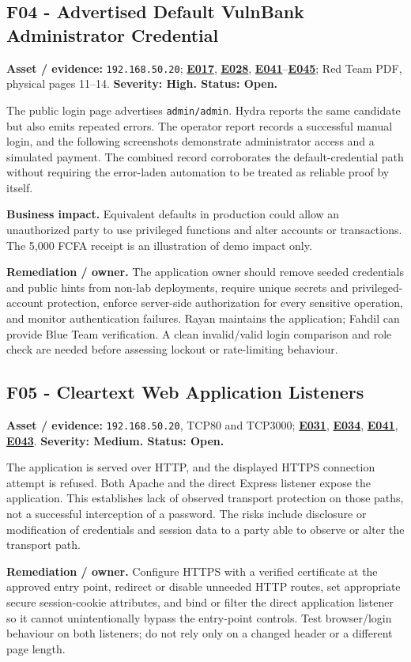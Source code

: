 \documentclass[11pt,a4paper]{article}
\newcommand{\ev}[1]{\hyperref[ev:#1]{\textbf{#1}}}
\begin{document}
\subsection{F04 - Advertised Default VulnBank Administrator Credential}
\textbf{Asset / evidence:} \texttt{192.168.50.20}; \ev{E017}, \ev{E028}, \ev{E041}--\ev{E045}; Red Team PDF, physical pages 11--14. \textbf{Severity: High. Status: Open.}

The public login page advertises \texttt{admin/admin}. Hydra reports the same candidate but also emits repeated errors. The operator report records a successful manual login, and the following screenshots demonstrate administrator access and a simulated payment. The combined record corroborates the default-credential path without requiring the error-laden automation to be treated as reliable proof by itself.

\textbf{Business impact.} Equivalent defaults in production could allow an unauthorized party to use privileged functions and alter accounts or transactions. The 5,000 FCFA receipt is an illustration of demo impact only.

\textbf{Remediation / owner.} The application owner should remove seeded credentials and public hints from non-lab deployments, require unique secrets and privileged-account protection, enforce server-side authorization for every sensitive operation, and monitor authentication failures. Rayan maintains the application; Fahdil can provide Blue Team verification. A clean invalid/valid login comparison and role check are needed before assessing lockout or rate-limiting behaviour.

\subsection{F05 - Cleartext Web Application Listeners}
\textbf{Asset / evidence:} \texttt{192.168.50.20}, TCP80 and TCP3000; \ev{E031}, \ev{E034}, \ev{E041}, \ev{E043}. \textbf{Severity: Medium. Status: Open.}

The application is served over HTTP, and the displayed HTTPS connection attempt is refused. Both Apache and the direct Express listener expose the application. This establishes lack of observed transport protection on those paths, not a successful interception of a password. The risks include disclosure or modification of credentials and session data to a party able to observe or alter the transport path.

\textbf{Remediation / owner.} Configure HTTPS with a verified certificate at the approved entry point, redirect or disable unneeded HTTP routes, set appropriate secure session-cookie attributes, and bind or filter the direct application listener so it cannot unintentionally bypass the entry-point controls. Test browser/login behaviour on both listeners; do not rely only on a changed header or a different page length.
\end{document}
